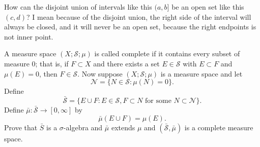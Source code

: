 \documentclass[12pt]{article}
\newenvironment{exercise}[1]{\begin{tcolorbox}[colback=black!15, colframe=black!80, breakable, title=#1]}{\end{tcolorbox}}
\newenvironment{solution}{\begin{tcolorbox}[colback=white, colframe=black!50, breakable, title=Solution. ]\setlength{\parskip}{0.8em}}{\end{tcolorbox}}
\begin{document}
    \begin{solution}
        How can the disjoint union of intervals like this $(a,b]$ be an open set like this $(c,d)$? I mean because of the disjoint union, the right side of the interval will always be closed, and it will never be an open set, because the right endpoints is not inner point. 
    \end{solution}

    \begin{exercise}{6}
        A measure space $(X; \mathscr{S}; \mu)$ is called complete if it contains every subset of measure $0$; that is, if $F \subset X$ and there exists a set $E \in \mathscr{S}$ with $E \subset F$ and $\mu(E) = 0$, then $F \in \mathscr{S}$. Now suppose $(X; \mathscr{S}; \mu)$ is a measure space and let
        \[\mathscr{N}=\{N\in\mathscr{S}:\mu(N)=0\}. \]
        Define
        \[\bar{\mathscr{S}}=\{E\cup F: E\in\mathscr{S}, F\subset N \text{ for some } N\subset \mathscr{N}\}. \]
        Define $\bar{\mu}: \bar{\mathscr{S}}\to[0,\infty]$ by
        \[\bar{\mu}(E\cup F)=\mu(E). \]
        Prove that $\bar{S}$ is a $\sigma$-algebra and $\bar{\mu}$ extends $\mu$ and $(\bar{\mathscr{S}}, \bar{\mu})$ is a complete measure space. 
    \end{exercise}
\end{document}
